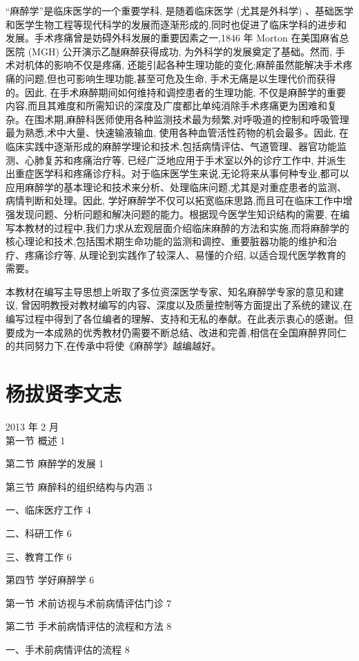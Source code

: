 \documentclass[10pt]{article}
\begin{document}
“麻醉学”是临床医学的一个重要学科, 是随着临床医学 (尤其是外科学) 、基础医学和医学生物工程等现代科学的发展而逐渐形成的,同时也促进了临床学科的进步和发展。手术疼痛曾是妨碍外科发展的重要因素之一,1846 年 Morton 在美国麻省总医院 (MGH) 公开演示乙醚麻醉获得成功, 为外科学的发展奠定了基础。然而, 手术对机体的影响不仅是疼痛, 还能引起各种生理功能的变化;麻醉虽然能解决手术疼痛的问题,但也可影响生理功能,甚至可危及生命, 手术无痛是以生理代价而获得的。因此, 在手术麻醉期间如何维持和调控患者的生理功能, 不仅是麻醉学的重要内容,而且其难度和所需知识的深度及广度都比单纯消除手术疼痛更为困难和复杂。在围术期,麻醉科医师使用各种监测技术最为频繁,对呼吸道的控制和呼吸管理最为熟悉,术中大量、快速输液输血, 使用各种血管活性药物的机会最多。因此, 在临床实践中逐渐形成的麻醉学理论和技术,包括病情评估、气道管理、器官功能监测、心肺复苏和疼痛治疗等, 已经广泛地应用于手术室以外的诊疗工作中, 并派生出重症医学科和疼痛诊疗科。对于临床医学生来说,无论将来从事何种专业,都可以应用麻醉学的基本理论和技术来分析、处理临床问题,尤其是对重症患者的监测、病情判断和处理。因此, 学好麻醉学不仅可以拓宽临床思路,而且可在临床工作中增强发现问题、分析问题和解决问题的能力。根据现今医学生知识结构的需要, 在编写本教材的过程中,我们力求从宏观层面介绍临床麻醉的方法和实施,而将麻醉学的核心理论和技术,包括围术期生命功能的监测和调控、重要脏器功能的维护和治疗、疼痛诊疗等, 从理论到实践作了较深人、易懂的介绍, 以适合现代医学教育的需要。

本教材在编写主导思想上听取了多位资深医学专家、知名麻醉学专家的意见和建议, 曾因明教授对教材编写的内容、深度以及质量控制等方面提出了系统的建议,在编写过程中得到了各位编者的理解、支持和无私的奉献。在此表示衷心的感谢。但要成为一本成熟的优秀教材仍需要不断总结、改进和完善,相信在全国麻醉界同仁的共同努力下,在传承中将使《麻醉学》越编越好。

\section*{杨拔贤李文志}
2013 年 2 月\\
第一节 概述 1

第二节 麻醉学的发展 1

第三节 麻醉科的组织结构与内涵 3

一、临床医疗工作 4

二、科研工作 6

三、教育工作 6

第四节 学好麻醉学 6

第一节 术前访视与术前病情评估门诊 7

第二节 手术前病情评估的流程和方法 8

一、手术前病情评估的流程 8
\end{document}
